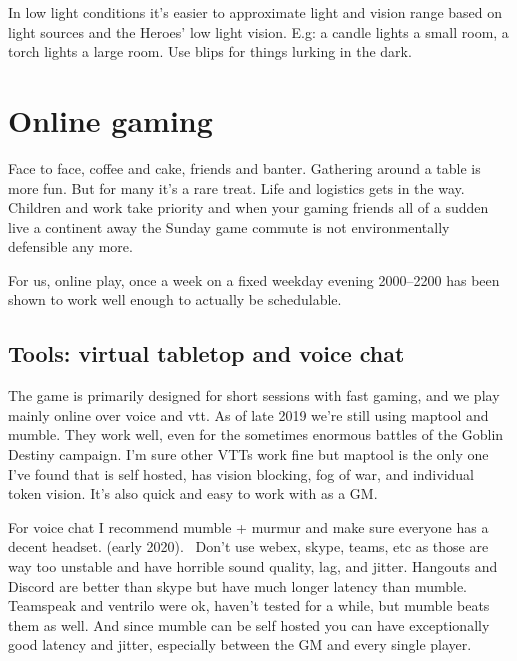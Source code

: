 In low light conditions it's easier to approximate light and vision range based on light sources and the Heroes' low light vision. E.g: a candle lights a small room, a torch lights a large room. Use blips for things lurking in the dark.









\section*{Online gaming}
Face to face, coffee and cake, friends and banter. Gathering around a table is more fun. But for many it's a rare treat. Life and logistics gets in the way. Children and work take priority and when your gaming friends all of a sudden live a continent away the Sunday game commute is not environmentally defensible any more.

For us, online play, once a week on a fixed weekday evening 2000--2200 has been shown to work well enough to actually be schedulable.


\subsection*{Tools: virtual tabletop and voice chat}
The game is primarily designed for short sessions with fast gaming, and we play mainly online over voice and vtt. As of late 2019 we're still using maptool and mumble. They work well, even for the sometimes enormous battles of the Goblin Destiny campaign. I'm sure other VTTs work fine but maptool is the only one I've found that is self hosted, has vision blocking, fog of war, and individual token vision. It's also quick and easy to work with as a GM.

For voice chat I recommend mumble + murmur and make sure everyone has a decent headset. \vvsmall(early 2020)\normalsize.~ Don't use webex, skype, teams, etc as those are way too unstable and have horrible sound quality, lag, and jitter. Hangouts and Discord are better than skype but have much longer latency than mumble. Teamspeak and ventrilo were ok, haven't tested for a while, but mumble beats them as well. And since mumble can be self hosted you can have exceptionally good latency and jitter, especially between the GM and every single player.

